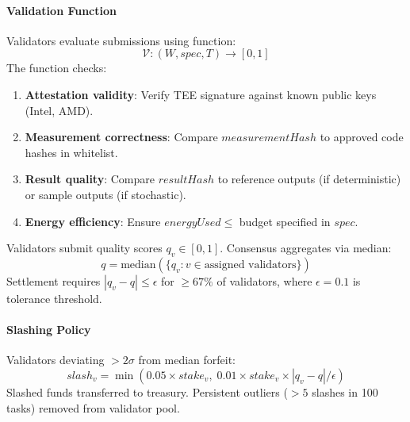 \documentclass[11pt]{article}
\begin{document}
\paragraph{Validation Function} Validators evaluate submissions using function:
\begin{equation}
\mathcal{V}: (W, spec, T) \rightarrow [0, 1]
\end{equation}
The function checks:
\begin{enumerate}[noitemsep]
  \item \textbf{Attestation validity}: Verify TEE signature against known public keys (Intel, AMD).
  \item \textbf{Measurement correctness}: Compare $measurementHash$ to approved code hashes in whitelist.
  \item \textbf{Result quality}: Compare $resultHash$ to reference outputs (if deterministic) or sample outputs (if stochastic).
  \item \textbf{Energy efficiency}: Ensure $energyUsed \leq$ budget specified in $spec$.
\end{enumerate}
Validators submit quality scores $q_v \in [0,1]$. Consensus aggregates via median:
\begin{equation}
q = \text{median}(\{q_v : v \in \text{assigned validators}\})
\end{equation}
Settlement requires $|q_v - q| \leq \epsilon$ for $\geq 67\%$ of validators, where $\epsilon = 0.1$ is tolerance threshold.

\paragraph{Slashing Policy} Validators deviating $>2\sigma$ from median forfeit:
\begin{equation}
slash_v = \min(0.05 \times stake_v, \; 0.01 \times stake_v \times |q_v - q| / \epsilon)
\end{equation}
Slashed funds transferred to treasury. Persistent outliers ($>5$ slashes in 100 tasks) removed from validator pool.
\end{document}

